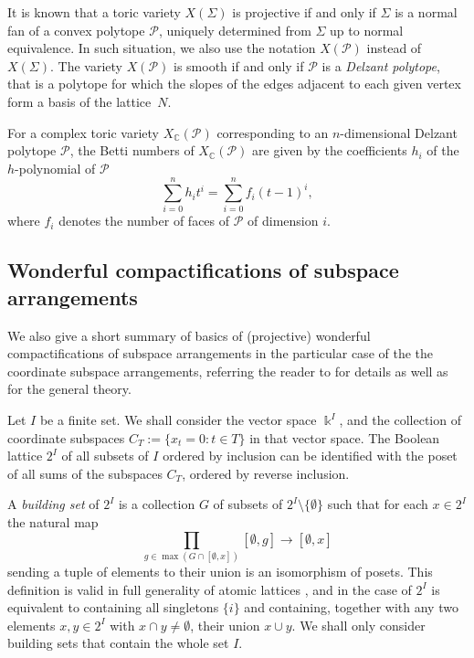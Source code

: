 \documentclass[11pt]{article}
\theoremstyle{definition}
\numberwithin{equation}{section}
\newcommand\calP{\mathcal{P}}
\newcommand\kk{\Bbbk}
\begin{document}
It is known that a toric variety $X(\Sigma)$ is projective if and only if $\Sigma$ is a normal fan of a convex polytope $\calP$, uniquely determined from $\Sigma$ up to normal equivalence. In such situation, we also use the notation $X(\calP)$ instead of $X(\Sigma)$. The variety $X(\calP)$ is smooth if and only if $\calP$ is a \emph{Delzant polytope}, that is a polytope for which the slopes of the edges adjacent to each given vertex form a basis of the lattice~$N$. 

For a complex toric variety $X_{\mathbb{C}}(\calP)$ corresponding to an $n$-dimensional Delzant polytope $\calP$, the Betti numbers of $X_{\mathbb{C}}(\calP)$ are given by the coefficients $h_i$ of the $h$-polynomial of $\calP$ 
 \[
\sum_{i=0}^n h_it^i=\sum_{i=0}^n f_i(t-1)^i,   
 \]
where $f_i$ denotes the number of faces of $\calP$ of dimension $i$.


\subsection{Wonderful compactifications of subspace arrangements}\label{sec:rec-wond}

We also give a short summary of basics of (projective) wonderful compactifications of subspace arrangements in the particular case of the the coordinate subspace arrangements, referring the reader to \cite{MR1366622,MR2038195,MR2746338} for details as well as for the general theory.

Let $I$ be a finite set. We shall consider the vector space $\kk^I$, and the collection of coordinate subspaces $C_T:=\{x_t=0\colon t\in T\}$ in that vector space. The Boolean lattice $2^I$ of all subsets of $I$ ordered by inclusion can be identified with the poset of all sums of the subspaces $C_T$, ordered by reverse inclusion. 

A \emph{building set} of $2^I$ is a collection $G$ of subsets of $2^I\setminus\{\emptyset\}$ such that for each $x\in 2^I$ the natural map
 \[
\prod_{g\in \max(G\cap [\emptyset,x])}[\emptyset,g]\to 
[\emptyset,x]
 \]
sending a tuple of elements to their union is an isomorphism of posets. This definition is valid in full generality of atomic lattices \cite{MR2038195}, and in the case of $2^I$ is equivalent to containing all singletons $\{i\}$ and containing, together with any two elements $x,y\in 2^I$ with $x\cap y\ne\emptyset$, their union $x\cup y$. We shall only consider building sets that contain the whole set $I$.
\end{document}
